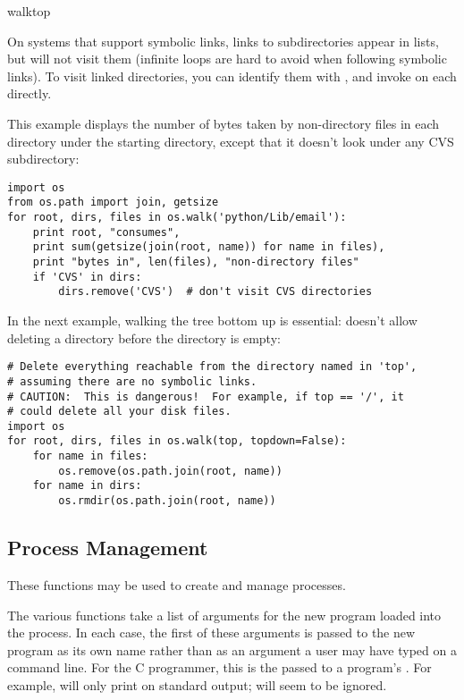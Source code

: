 \begin{funcdesc}{walk}{top}
\begin{notice}
On systems that support symbolic links, links to subdirectories appear
in  lists, but  will not visit them
(infinite loops are hard to avoid when following symbolic links).
To visit linked directories, you can identify them with
, and invoke 
on each directly.
\end{notice}

This example displays the number of bytes taken by non-directory files
in each directory under the starting directory, except that it doesn't
look under any CVS subdirectory:

\begin{verbatim}
import os
from os.path import join, getsize
for root, dirs, files in os.walk('python/Lib/email'):
    print root, "consumes",
    print sum(getsize(join(root, name)) for name in files),
    print "bytes in", len(files), "non-directory files"
    if 'CVS' in dirs:
        dirs.remove('CVS')  # don't visit CVS directories
\end{verbatim}

In the next example, walking the tree bottom up is essential:
 doesn't allow deleting a directory before the
directory is empty:

\begin{verbatim}
# Delete everything reachable from the directory named in 'top',
# assuming there are no symbolic links.
# CAUTION:  This is dangerous!  For example, if top == '/', it
# could delete all your disk files.
import os
for root, dirs, files in os.walk(top, topdown=False):
    for name in files:
        os.remove(os.path.join(root, name))
    for name in dirs:
        os.rmdir(os.path.join(root, name))
\end{verbatim}

\end{funcdesc}

\subsection{Process Management \label{os-process}}

These functions may be used to create and manage processes.

The various  functions take a list of arguments for
the new program loaded into the process.  In each case, the first of
these arguments is passed to the new program as its own name rather
than as an argument a user may have typed on a command line.  For the
C programmer, this is the  passed to a program's
.  For example,  will only print  on standard output; 
will seem to be ignored.


